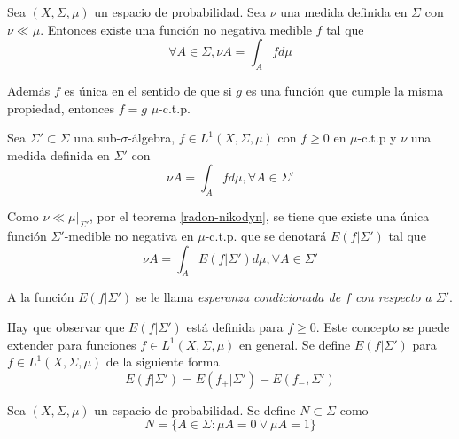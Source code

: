 \begin{teorema}\label{radon-nikodyn}
	Sea $(X,\Sigma,\mu)$ un espacio de probabilidad. Sea $\nu$ una medida definida en $\Sigma$ con $\nu \ll \mu$. Entonces existe una función no negativa medible $f$ tal que	
	\begin{equation}
		\forall A \in \Sigma, \nu A = \int_A f d\mu
	\end{equation}
	
	Además $f$ es única en el sentido de que si $g$ es una función que cumple la misma propiedad, entonces $f = g$ $\mu$-c.t.p.
\end{teorema}

\begin{definicion}\label{esperanza_conficionada_def}
	Sea $\Sigma' \subset \Sigma$ una sub-$\sigma$-álgebra, $f \in L^1(X,\Sigma,\mu)$ con $f \geq 0$ en $\mu$-c.t.p y $\nu$ una medida definida en $\Sigma'$ con	
	\begin{equation}
		\nu A = \int_A f d\mu, \forall A \in \Sigma'
	\end{equation}
	
	Como $\nu \ll \mu|_{\Sigma'}$, por el teorema \ref*{radon-nikodyn}, se tiene que existe una única función $\Sigma'$-medible no negativa en $\mu$-c.t.p. que se denotará $E(f|\Sigma')$ tal que	
	\begin{equation}
		\nu A = \int_A E(f|\Sigma') d\mu, \forall A \in \Sigma'
	\end{equation}
	
	A la función $E(f|\Sigma')$ se le llama \textit{esperanza condicionada de $f$ con respecto a $\Sigma'$}. 
\end{definicion}

Hay que observar que $E(f|\Sigma')$ está definida para $f \geq 0$. Este concepto se puede extender para funciones $f \in L^1(X,\Sigma,\mu)$ en general. Se define $E(f|\Sigma')$ para $f \in L^1(X,\Sigma,\mu)$ de la siguiente forma
\begin{equation}
	E(f|\Sigma') = E(f_+|\Sigma')- E(f_-,\Sigma')
\end{equation}

\begin{definicion}\label{trivial_sigma-algebra}
	Sea $(X,\Sigma,\mu)$ un espacio de probabilidad. Se define $N \subset \Sigma$ como	
	\begin{equation}
	N = \{ A \in \Sigma: \mu A = 0 \vee \mu A = 1 \}
	\end{equation}
\end{definicion}


